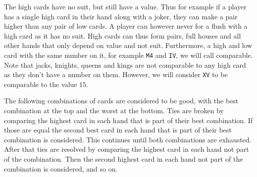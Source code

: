 The high cards have no suit, but still have a value. 
Thus for example if a player has a single high card in their hand along with a joker, 
they can make a pair higher than any pair of low cards.
A player can however never for a flush with a high card as it has no suit.
High cards can thus form pairs, full houses and all other hands that only depend on value and not suit.
Furthermore, a high and low card with the same number on it, for example \texttt{M4} and \texttt{IV}, we will call comparable.
Note that jacks, knights, queens and kings are not comparable to any high card as they don't have a number on them.
However, we will consider \texttt{XV} to be comparable to the value $15$.

The following combinations of cards are considered to be good, 
with the best combination at the top and the worst at the bottom. 
Ties are broken by comparing the highest card in each hand that is part of their best combination.
If those are equal the second best card in each hand that is part of their best combination is considered.
This continues until both combinations are exhausted. 
After that ties are resolved by comparing the highest card in each hand not part of the combination.
Then the second highest card in each hand not part of the combination is considered, and so on.

